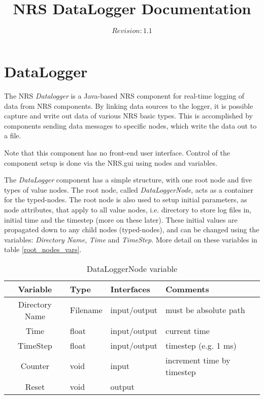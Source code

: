\documentclass[10pt, notitlepage, a4paper]{article}
\begin{document}
\title{NRS DataLogger Documentation}
\author{$Revision: 1.1 $}
\maketitle

\section{DataLogger}
The NRS {\it Datalogger} is a Java-based NRS component for real-time logging of
data from NRS components. By linking data sources to the logger, it is possible
capture and write out data of various NRS basic types. This is accomplished by
components sending data messages to specific nodes, which write the data out to
a file. 

Note that this component has no front-end user interface. Control of the
component setup is done via the NRS.gui using nodes and variables.

The {\it DataLogger} component has a simple structure, with one root node and five types of value nodes. The root node, called {\it DataLoggerNode}, acts as a
container for the typed-nodes. The root node is also used to setup initial
parameters, as node attributes, that apply to all value nodes, i.e. directory to
store log files in, initial time and the timestep (more on these later). These
initial values are propagated down to any child nodes (typed-nodes), and can be
changed using the variables: {\it Directory Name}, {\it Time} and {\it
  TimeStep}. More detail on these variables in table \ref{root_nodes_vars}.

\begin{table}[!ht]
\begin{center}
\label{root_node_vars}
\caption{DataLoggerNode variable}
\begin{tabular}{|c|l|l|l|}
\hline Variable & Type & Interfaces & Comments\\ \hline
\hline Directory Name & Filename & input/output & must be absolute path\\
\hline Time & float & input/output & current time\\
\hline TimeStep & float & input/output & timestep (e.g. 1 ms)\\
\hline Counter & void & input & increment time by timestep\\
\hline Reset & void & output & \\
\hline
\end{tabular}
\end{center}
\end{table}
\end{document}
